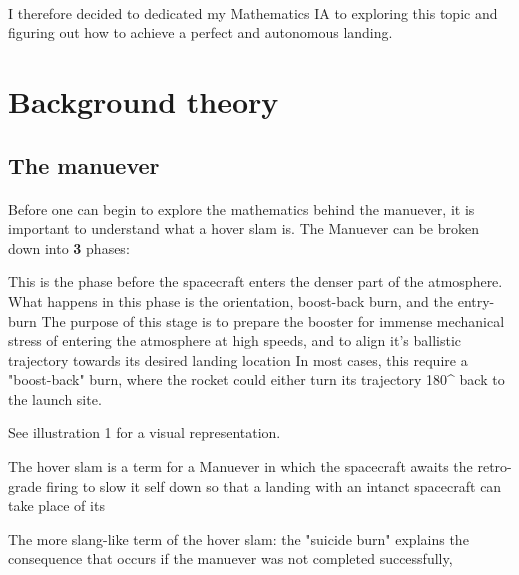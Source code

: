\documentclass[12pt]{article}
\begin{document}
    \paragraph{\noindent}
        I therefore decided to dedicated my Mathematics IA to exploring this topic and figuring out how to achieve a perfect and autonomous landing.

    

    \section{Background theory}
        \subsection{The manuever}
        \paragraph{}
        Before one can begin to explore the mathematics behind the manuever, it is important to understand what a hover slam is.
        The Manuever can be broken down into \textbf{3} phases: 
            



    This is the phase before the spacecraft enters the denser part of the atmosphere. What happens in this phase is the orientation, boost-back burn, and the entry-burn
    The purpose of this stage is to prepare the booster for immense mechanical stress of entering the atmosphere at high speeds, and to align it's ballistic trajectory towards its desired landing location
    In most cases, this require a "boost-back" burn, where the rocket could either turn its trajectory 180^{\circ} back to the launch site. 
    
    
    See illustration 1 for a visual representation.
    

    The hover slam is a term for a Manuever in which the spacecraft awaits the retro-grade firing to slow it self down so that a landing with an intanct spacecraft can take place of its 

    The more slang-like term of the hover slam: the "suicide burn" explains the consequence that occurs if the manuever was not completed successfully,
    

    
\end{document}
